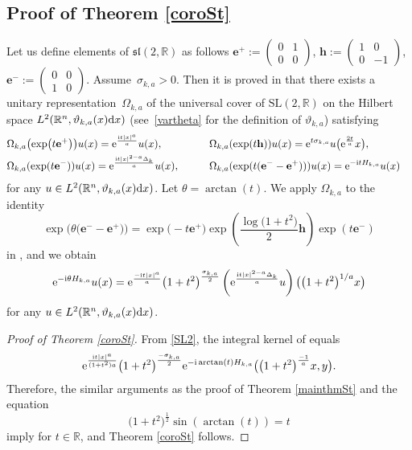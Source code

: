 \documentclass[10pt,a4paper]{amsart}
\numberwithin{equation}{section}
\def\R{\mathbb{R}}%
\def\SL{\mathrm{SL}}
\def\sl{\mathfrak{sl}}
\newcommand{\bfe}{\mathbf{e}}
\newcommand{\bfh}{\mathbf{h}}
\begin{document}
\subsection[Proof of Theorem 1.3]{Proof of Theorem \ref{coroSt}}
Let us define elements of $\sl(2,\R)$ as follows
$
\bfe^+:=\left(\begin{smallmatrix}0&1\\0&0\end{smallmatrix}\right)$, $
\bfh:=\left(\begin{smallmatrix}1&0\\0&-1\end{smallmatrix}\right)$, $
\bfe^-:=\left(\begin{smallmatrix}0&0\\1&0\end{smallmatrix}\right)$.
Assume~${\sigma_{k,a}>0}$.
Then it is proved in \cite[Theorem 3.30]{BKO} that there exists a unitary representation~$\Omega_{k,a}$ of the universal cover \smash{$\widetilde{\SL}(2,\R)$} of $\SL(2,\R)$ on the Hilbert space $L^2(\R^n,\vartheta_{k,a}(x){\rm d}x)$ (see~\eqref{vartheta} for the definition of $\vartheta_{k,a}$) satisfying
\begin{alignat*}{3}
& \Omega_{k,a}\bigl(\exp\bigl(t\bfe^+\bigr)\bigr)u(x)={\rm e}^{\frac{{\rm i}t|x|^a}{a}}u(x),\qquad&& \Omega_{k,a}(\exp(t\mathbf{h}))u(x)={\rm e}^{t\sigma_{k,a}}u\bigl({\rm e}^{\frac{2t}{a}}x\bigr),& \\
& \Omega_{k,a}(\exp(t\bfe^-))u(x)={\rm e}^{\frac{{\rm i}t|x|^{2-a}\Delta_k}{a}}u(x),\qquad&&\Omega_{k,a}(\exp(t(\bfe^--\bfe^+)))u(x)={\rm e}^{-{\rm i}tH_{k,a}}u(x)&
\end{alignat*}
for any $u\in L^2(\R^n,\vartheta_{k,a}(x){\rm d}x)$.
Let $\theta=\arctan(t)$. We apply $\Omega_{k,a}$ to the identity
\[
\exp\bigl(\theta\bigl(\bfe^--\bfe^+\bigr)\bigr)=\exp\bigl(-t\bfe^+\bigr)\exp\left(\frac{\log\bigl(1+t^2\bigr)}{2}\bfh\right)\exp(t\bfe^-)
\]
in \smash{$\widetilde{\SL}(2,\R)$}, and we obtain
\begin{align}\label{SL2}
{\rm e}^{-{\rm i}\theta H_{k,a}}u(x)
={\rm e}^{\frac{-{\rm i}t|x|^a}{a}}\bigl(1+t^2\bigr)^{\frac{\sigma_{k,a}}{2}}\left({\rm e}^{\frac{{\rm i}t|x|^{2-a}\Delta_k}{a}}u\right)\bigl(\bigl(1+t^2\bigr)^{1/a}x\bigr)
\end{align}
for any $u\in L^2(\R^n,\vartheta_{k,a}(x){\rm d}x)$.

\begin{proof}[Proof of Theorem \ref{coroSt}]
From \eqref{SL2}, the integral kernel  of  equals
\begin{align*}
{\rm e}^{\frac{{\rm i}t|x|^a}{(1+t^2)a}}\bigl(1+t^2\bigr)^{\frac{-\sigma_{k,a}}{2}}{\rm e}^{-{\rm i}\arctan(t)H_{k,a}}\bigl(\bigl(1+t^2\bigr)^{\frac{-1}{a}}x,y\bigr).
\end{align*}
Therefore, the similar arguments as the proof of Theorem \ref{mainthmSt} and the equation
\[
\bigl(1+t^2\bigr)^{\frac{1}{2}}\sin(\arctan(t))=t
\]
 imply
 for $t\in\R$, and Theorem \ref{coroSt} follows.
\end{proof}
\end{document}
